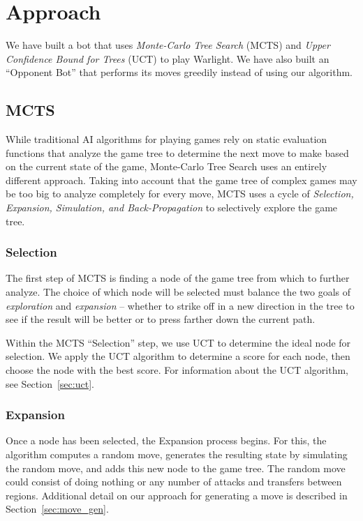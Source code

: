 \documentclass[a4paper,11pt]{article}
\begin{document}
\section{Approach}\label{sec:approach}
We have built a bot that uses \emph{Monte-Carlo Tree Search} (MCTS) and \emph{Upper 
Confidence Bound for Trees} (UCT) to play Warlight.  We have also built an ``Opponent Bot'' 
that performs its moves greedily instead of using our algorithm.

\subsection{MCTS}
While traditional AI algorithms for playing games rely on static evaluation functions that 
analyze the game tree to determine the next move to make based on the current state of the 
game, Monte-Carlo Tree Search uses an entirely different approach.  Taking into account that 
the game tree of complex games may be too big to analyze completely for every move, MCTS 
uses a cycle of \emph{Selection, Expansion, Simulation, and Back-Propagation} to selectively 
explore the game tree.

\subsubsection{Selection}
The first step of MCTS is finding a node of the game tree from which to further 
analyze.  The choice of which node will be selected must balance the two goals of 
\emph{exploration} and \emph{expansion} -- whether to strike off in a new direction in the 
tree to see if the result will be better or to press farther down the current path.

Within the MCTS ``Selection'' step, we use UCT to determine the ideal node for 
selection.  We apply the UCT algorithm to determine a score for each node, then choose the 
node with the best score.  For information about the UCT algorithm, see Section~\ref{sec:uct}.

\subsubsection{Expansion}
Once a node has been selected, the Expansion process begins. For this, 
the algorithm computes a random move, generates the resulting state by simulating the random move, 
and adds this new node to the game tree. The random move could consist of doing nothing or any 
number of attacks and transfers between regions.  Additional detail on our approach for generating
a move is described in Section~\ref{sec:move_gen}.
\end{document}
